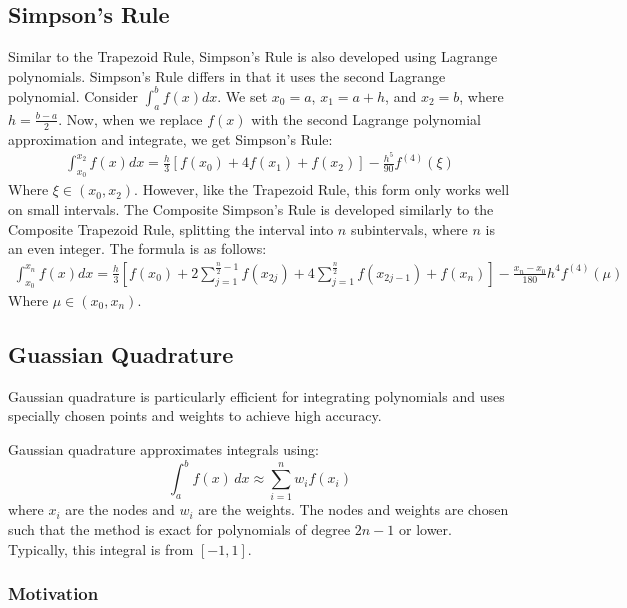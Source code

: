 \documentclass[12pt]{article}
\begin{document}
\subsection{Simpson's Rule}
Similar to the Trapezoid Rule, Simpson's Rule is also developed using Lagrange polynomials. Simpson's Rule differs in that
it uses the second Lagrange polynomial. Consider $\int_{a}^{b} f(x)dx$. We set $x_0 = a$, $x_1 = a + h$, and $x_2 = b$, where $h = \frac{b - a}{2}$.
Now, when we replace $f(x)$ with the second Lagrange polynomial approximation and integrate, we get Simpson's Rule:
\begin{align*}
	\int_{x_0}^{x_2}f(x)dx = \frac{h}{3}[f(x_0) + 4f(x_1) + f(x_2)] - \frac{h^5}{90}f^{(4)}(\xi)
\end{align*}
Where $\xi \in (x_0, x_2)$. However, like the Trapezoid Rule, this form only works well on small intervals. The Composite Simpson's Rule is
developed similarly to the Composite Trapezoid Rule, splitting the interval into $n$ subintervals, where $n$ is an even integer.
The formula is as follows:
\begin{align*}
	\int_{x_0}^{x_n}f(x)dx = \frac{h}{3}[f(x_0) + 2\sum_{j=1}^{\frac{n}{2} - 1}f(x_{2j}) + 4\sum_{j=1}^{\frac{n}{2}}f(x_{2j - 1}) + f(x_n)] - \frac{x_n - x_0}{180}h^4f^{(4)}(\mu)
\end{align*}
Where $\mu \in (x_0, x_n)$.

\subsection{Guassian Quadrature}
Gaussian quadrature is particularly efficient for integrating polynomials and uses specially chosen points and weights to achieve high accuracy.

Gaussian quadrature approximates integrals using:
\[
	\int_a^b f(x) \, dx \approx \sum_{i=1}^n w_i f(x_i)
\]
where \( x_i \) are the nodes and $w_{i}$ are the weights.
The nodes and weights are chosen such that the method is exact for polynomials of degree $2n-1$ or lower.
Typically, this integral is from $[-1,1]$.

\subsubsection{Motivation}
\end{document}
